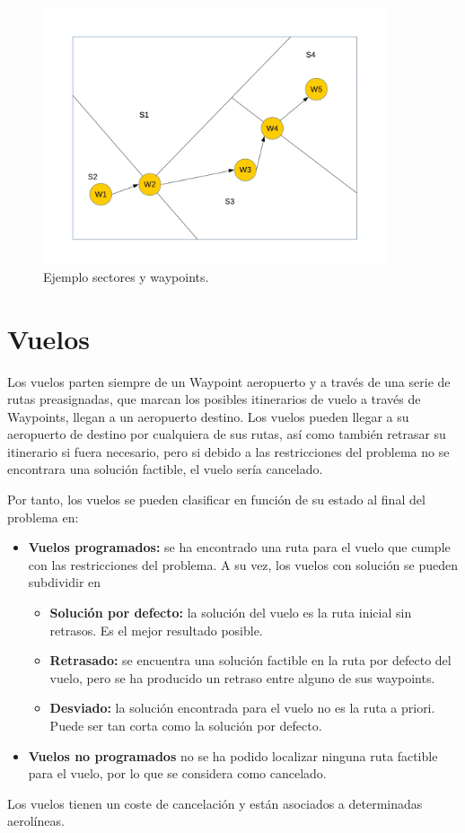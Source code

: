 \begin{figure}[h]
	\begin{center}
		\centering
		\includegraphics[width=0.9\textwidth]{./imagenes/descripcion_problema/sectoresYWaypoints.jpg}
		\caption{Ejemplo sectores y waypoints.}
		\label{fig: Ejemplo sectores y waypoints}
	\end{center}
\end{figure}


\section{Vuelos}
Los vuelos parten siempre de un Waypoint aeropuerto y a través de una serie de rutas preasignadas, que marcan los posibles itinerarios de vuelo a través de Waypoints, llegan a un aeropuerto destino. Los vuelos pueden llegar a su aeropuerto de destino por cualquiera de sus rutas, así como también retrasar su itinerario si fuera necesario, pero si debido a las restricciones del problema no se encontrara una solución factible, el vuelo sería cancelado.

Por tanto, los vuelos se pueden clasificar en función de su estado al final del problema en:
\begin{itemize}
	\item \textbf{Vuelos programados:} se ha encontrado una ruta para el vuelo que cumple con las restricciones del problema. A su vez, los vuelos con solución se pueden subdividir en
	\begin{itemize}
		\item \textbf{Solución por defecto:} la solución del vuelo es la ruta inicial sin retrasos. Es el mejor resultado posible.
		\item \textbf{Retrasado:} se encuentra una solución factible en la ruta por defecto del vuelo, pero se ha producido un retraso entre alguno de sus waypoints.
		\item \textbf{Desviado:} la solución encontrada para el vuelo no es la ruta a priori. Puede ser tan corta como la solución por defecto.
	\end{itemize}
	\item \textbf{Vuelos no programados} no se ha podido localizar ninguna ruta factible para el vuelo, por lo que se considera como cancelado.
\end{itemize}
Los vuelos tienen un coste de cancelación y están asociados a determinadas aerolíneas.

